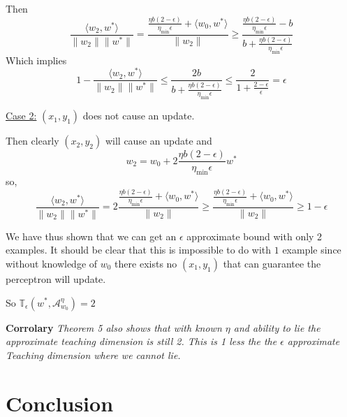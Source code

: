 \documentclass{article}
\newcommand{\learn}{\mathcal{A}_{w_0}^\eta}
\begin{document}
Then
$$
\frac{\langle w_2 , w^* \rangle}{\lVert w_2 \rVert \lVert w^* \rVert} = \frac{\frac{\eta b(2-\epsilon)}{\eta_{\min} \epsilon} + \langle w_0, w^* \rangle}{\lVert w_2 \rVert} \geq \frac{\frac{\eta b(2-\epsilon)}{\eta_{\min} \epsilon} - b}{b + \frac{\eta b(2-\epsilon)}{\eta_{\min} \epsilon}}
$$
Which implies
$$
1 - \frac{\langle w_2 , w^* \rangle}{\lVert w_2 \rVert \lVert w^* \rVert} \leq \frac{2b}{b + \frac{\eta b(2-\epsilon)}{\eta_{\min} \epsilon}}
\leq
\frac{2}{1 + \frac{2-\epsilon}{\epsilon}} = \epsilon
$$

\underline{Case 2:} $(x_1, y_1)$ does not cause an update.

Then clearly $(x_2, y_2)$ will cause an update and
$$
w_2 = w_0 + 2\frac{\eta b(2-\epsilon)}{\eta_{\min} \epsilon}w^* 
$$
so,
$$
\frac{\langle w_2 , w^* \rangle}{\lVert w_2 \rVert \lVert w^* \rVert} = 2\frac{\frac{\eta b(2-\epsilon)}{\eta_{\min} \epsilon} + \langle w_0, w^* \rangle}{\lVert w_2 \rVert} \geq \frac{\frac{\eta b(2-\epsilon)}{\eta_{\min} \epsilon} + \langle w_0, w^* \rangle}{\lVert w_2 \rVert} \geq 1 - \epsilon
$$

We have thus shown that we can get an $\epsilon$ approximate bound with only 2 examples. It should be clear that this is impossible to do with $1$ example since without knowledge of $w_0$ there exists no $(x_1, y_1)$ that can guarantee the perceptron will update.

So 
$
\mathbb{T}_{\epsilon}(w^*, \learn) = 2
$

\textbf{Corrolary}
\textit{
Theorem 5 also shows that with known $\eta$ and ability to lie the approximate teaching dimension is still 2. This is 1 less the the $\epsilon$ approximate Teaching dimension where we cannot lie. \cite{perceptron}
}

\section{Conclusion}



\small


\end{document}
